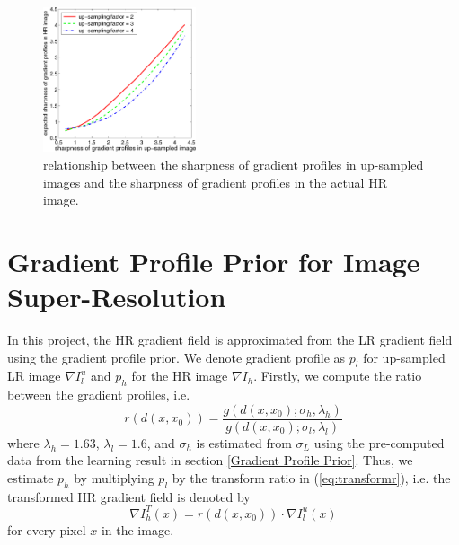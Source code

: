 \documentclass[a4paper,11pt]{article}
\begin{document}
\begin{figure}[H]
	\centering
	\includegraphics[width=0.4\textwidth]{Expected-sharpness-of-the-gradient-profiles-in-HR-image-with-respect-to-sharpness-of-the.png}
	\caption{relationship between the sharpness of gradient profiles in up-sampled images and the sharpness of gradient profiles in the actual HR image.}
	\label{fig:es}
\end{figure}

\section{Gradient Profile Prior for Image Super-Resolution}

In this project, the HR gradient field is approximated from the LR gradient field using the gradient profile prior. We denote gradient profile as $p_l$ for up-sampled LR image $\nabla I_l^u$ and $p_h$ for the HR image $\nabla I_h$. Firstly, we compute the ratio between the gradient profiles, i.e.
\begin{equation}
	\label{eq:transformr}
	r(d(x, x_0)) = \frac{g(d(x, x_0); \sigma_h, \lambda_h)}{g(d(x, x_0); \sigma_l, \lambda_l)}
\end{equation}
where $\lambda_h=1.63$, $\lambda_l=1.6$, and $\sigma_h$ is estimated from $\sigma_L$ using the pre-computed data from the learning result in section \ref{Gradient Profile Prior}. Thus, we estimate $p_h$ by multiplying $p_l$ by the transform ratio in (\ref{eq:transformr}), i.e. the transformed HR gradient field is denoted by
\begin{equation}
	\label{eq:transformgrad}
	\nabla I_h^T(x) = r(d(x, x_0)) \cdot \nabla I_l^u(x)
\end{equation}
for every pixel $x$ in the image.
\end{document}
